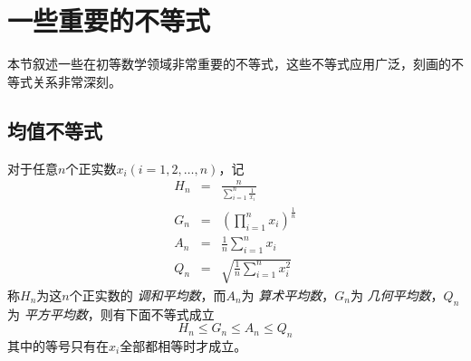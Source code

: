 
\section{一些重要的不等式}
\label{sec:some-important-inequation}

本节叙述一些在初等数学领域非常重要的不等式，这些不等式应用广泛，刻画的不等式关系非常深刻。

\subsection{均值不等式}

\begin{theorem}[均值不等式]
  对于任意$n$个正实数$x_{i}(i=1,2,\ldots,n)$，记
  \begin{eqnarray}
    \label{eq:definition-of-average}
    H_n &=& \frac{n}{\sum_{i=1}^n \frac{1}{x_i}} \\
    G_n &=& (\prod_{i=1}^nx_{i})^{\frac{1}{n}} \\
    A_n &=& \frac{1}{n}\sum_{i=1}^{n}x_i \\
    Q_n &=& \sqrt{\frac{1}{n}\sum_{i=1}^nx_i^2}
  \end{eqnarray}
  称$H_{n}$为这$n$个正实数的 \emph{调和平均数}，而$A_{n}$为 \emph{算术平均数}，$G_n$为 \emph{几何平均数}，$Q_{n}$为 \emph{平方平均数}，则有下面不等式成立
  \begin{equation}
    \label{eq:mean-inequation-general}
    H_{n} \leqslant G_{n} \leqslant A_{n} \leqslant Q_{n}
  \end{equation}
  其中的等号只有在$x_{i}$全部都相等时才成立。
\end{theorem}

